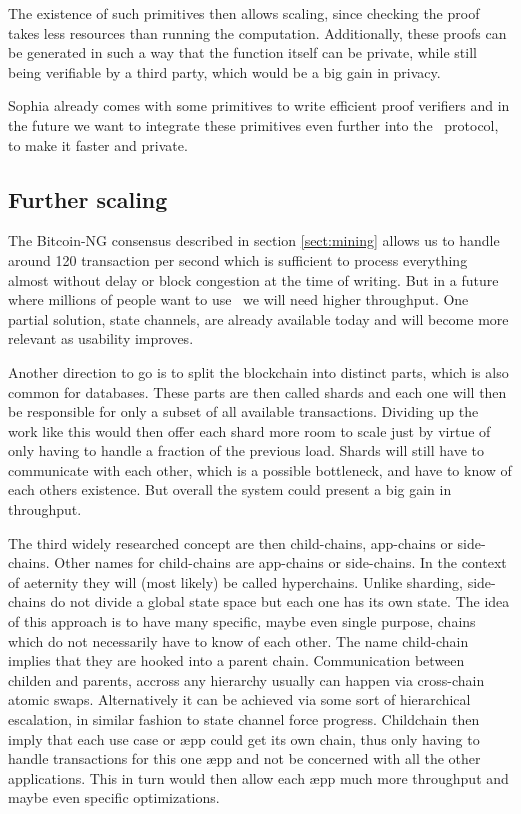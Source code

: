 The existence of such primitives then allows scaling, since checking the
proof takes less resources than running the computation. Additionally, these
proofs can be generated in such a way that the function itself can be private,
while still being verifiable by a third party, which would be a big gain in
privacy.

Sophia already comes with some primitives to write efficient proof verifiers
and in the future we want to integrate these primitives even further into the
\aet\ protocol, to make it faster and private.

\subsection{Further scaling}

The Bitcoin-NG consensus described in section \ref{sect:mining} allows us to
handle around 120 transaction per second which is sufficient to process
everything almost without delay or block congestion at the time of writing.
But in a future where millions of people want to use \aet\ we will need higher
throughput. One partial solution, state channels, are already available today
and will become more relevant as usability improves.


Another direction to go is to split the blockchain into distinct parts, which
is also common for databases. These parts are then called shards and each one
will then be responsible for only a subset of all available transactions.
Dividing up the work like this would then offer each shard more room to scale
just by virtue of only having to handle a fraction of the previous load. Shards
will still have to communicate with each other, which is a possible bottleneck,
and have to know of each others existence. But overall the system could present
a big gain in throughput.

The third widely researched concept are then child-chains, app-chains or
side-chains. Other names for child-chains are app-chains or side-chains.
In the context of aeternity they will (most likely) be called hyperchains.
Unlike sharding, side-chains do not divide a global state space but each
one has its own state. The idea of this approach is to have many specific,
maybe even single purpose, chains which do not necessarily have to know of each
other. The name child-chain implies that they are
hooked into a parent chain. Communication between childen and parents, accross
any hierarchy usually can happen via cross-chain atomic swaps. Alternatively it
can be achieved via some sort of hierarchical escalation, in similar fashion to
state channel force progress.
Childchain then imply that each use case or æpp could get its own chain,
thus only having to handle transactions for this one æpp and not be concerned
with all the other applications. This in turn would then allow each æpp much
more throughput and maybe even specific optimizations.

